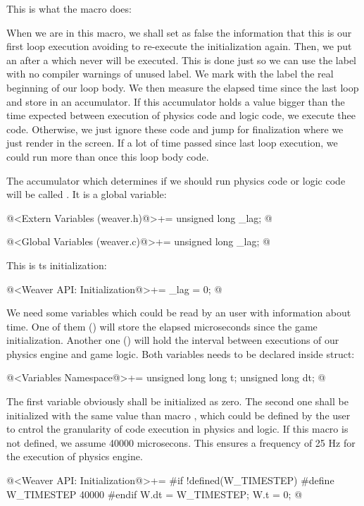 This is what the macro  does:

When we are in this macro, we shall set as false the information that
this is our first loop execution avoiding to re-execute the
initialization again. Then, we put an  after
a  which never will be executed. This is done just so
we can use the label  with
no compiler warnings of unused label. We mark with the
label  the real beginning of
our loop body. We then measure the elapsed time since the last loop
and store in an accumulator. If this accumulator holds a value bigger
than the time expected between execution of physics code and logic
code, we execute thee code. Otherwise, we just ignore these code and
jump for finalization where we just render in the screen. If a lot of
time passed since last loop execution, we could run more than once
this loop body code.

The accumulator which determines if we should run physics code or
logic code will be called . It is a global variable:

\iniciocodigo
@<Extern Variables (weaver.h)@>+=
unsigned long _lag;
@
\fimcodigo

\iniciocodigo
@<Global Variables (weaver.c)@>+=
unsigned long _lag;
@
\fimcodigo


This is ts initialization:

\iniciocodigo
@<Weaver API: Initialization@>+=
_lag = 0;
@
\fimcodigo

We need some variables which could be read by an user with information
about time. One of them () will store the elapsed
microseconds since the game initialization. Another one
() will hold the interval between executions of our
physics engine and game logic. Both variables needs to be declared
inside  struct:

\iniciocodigo
@<Variables Namespace@>+=
unsigned long long t;
unsigned long dt;
@
\fimcodigo

The first variable obviously shall be initialized as zero.  The second
one shall be initialized with the same value than
macro , which could be defined by the user to
cntrol the granularity of code execution in physics and logic. If this
macro is not defined, we assume 40000 microsecons. This ensures a
frequency of 25 Hz for the execution of physics engine.

\iniciocodigo
@<Weaver API: Initialization@>+=
#if !defined(W_TIMESTEP)
#define W_TIMESTEP 40000
#endif
W.dt = W_TIMESTEP;
W.t = 0;
@
\fimcodigo

